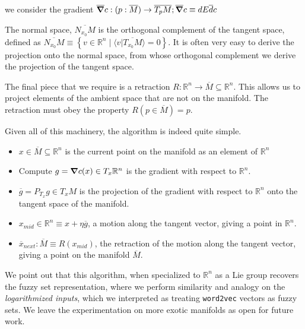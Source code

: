\documentclass[11pt]{book}
\begin{document}
we consider the gradient
$\overline \grad c : (p: \overline M) \rightarrow \overline{T_p M}; \overline \grad c \equiv dE \overline dc$

The normal space,
$\overline{N_{x_0} M}$ is the orthogonal complement of the tangent space, defined
as $\overline{N_{x_0} M} \equiv \left\{ v \in \mathbb R^n \mid \langle v | \overline{T_{x_0} M} \rangle = 0 \right\}$.
It is often very easy to derive the projection onto the normal space, from
whose orthogonal complement we derive the projection of the tangent space.

The final piece that we require is a retraction $R: \mathbb R^n \rightarrow \overline M \subseteq \mathbb R^n$. This allows
us to project elements of the ambient space that are not on the manifold. The
retraction must obey the property $R(p \in \overline M) = p$.

Given all of this machinery, the algorithm is indeed quite simple.

\begin{itemize}
	\item $x \in \overline M \subseteq \mathbb R^n$ is the current point on the manifold as an element of $\mathbb R^n$
	\item Compute $g = \grad c(x) \in T_x \mathbb R^n$ is the gradient with respect to $\mathbb R^n$.
	\item $\overline g = P_{T_x} g \in T_x M$ is the projection of the gradient with respect to $\mathbb R^n$ onto the
	tangent space of the manifold.
	\item $x_{mid}\in \mathbb R^n \equiv x + \eta \overline g$, a motion along the tangent vector, giving a point in
	$\mathbb R^n$.
	\item $\overline x_{next}: \overline M \equiv R(x_{mid})$, the retraction of the motion along the tangent vector,
	giving a point on the manifold $\overline M$.
\end{itemize}


We point out that this algorithm, when specialized to $\mathbb R^n$ as a Lie
group recovers the fuzzy set representation, where we perform similarity and
analogy on the \emph{logarithmized inputs}, which we interpreted as treating
\texttt{word2vec} vectors as fuzzy sets. We leave the experimentation on more
exotic manifolds as open for future work.

\end{document}
